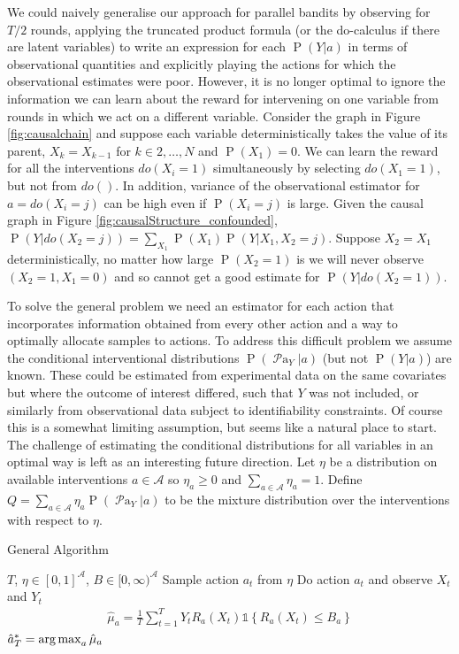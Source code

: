 \documentclass[11pt,a4paper,twoside]{report}
\newcommand{\calA}{\mathcal A}
\newcommand{\set}[1]{\left\{#1\right\}}
\newcommand{\ind}[1]{\mathds{1}\!\!\set{#1}}
\newcommand{\argmax}{\operatornamewithlimits{arg\,max}}
\newcommand{\eq}[1]{\begin{align*}#1\end{align*}}
\renewcommand{\P}[1]{\operatorname{P}\left(#1\right)}
\newcommand{\parents}[1]{\operatorname{\mathcal{P}a}_{#1}}
\theoremstyle{plain}
\theoremstyle{definition}
\begin{document}
We could naively generalise our approach for parallel bandits by observing for $T/2$ rounds, applying the truncated product formula (or the do-calculus if there are latent variables) to write an expression for each $\P{Y|a}$ in terms of observational quantities and explicitly playing the actions for which the observational 
estimates were poor. However, it is no longer optimal to ignore the information we can learn about the reward for intervening on one variable 
from rounds in which we act on a different variable. Consider the graph in Figure \ref{fig:causalchain} and suppose each variable deterministically 
takes the value of its parent, $X_k = X_{k-1}$ for $k\in {2,\ldots,N}$ and $\P{X_1} = 0$. We can learn the reward for all the interventions $do(X_i = 1)$ 
simultaneously by selecting $do(X_1 = 1)$, but not from $do()$. In addition, variance of the observational estimator for $a = do(X_i = j)$ can be 
high even if $\P{X_i = j}$ is large. Given the causal graph in Figure \ref{fig:causalStructure_confounded}, $\P{Y|do(X_2= j)} = \sum_{X_1}\P{X_1}\P{Y|X_1, X_2 = j}$. 
Suppose $X_2 = X_1$ deterministically, no matter how large $\P{X_2 = 1}$ is we will never observe $(X_2=1,X_1 = 0)$ and so cannot 
get a good estimate for $\P{Y|do(X_2=1)}$. 

To solve the general problem we need an estimator for each action that incorporates information obtained from every other action and a way to optimally 
allocate samples to actions. To address this difficult problem we assume the conditional interventional distributions $\P{\parents{Y}|a}$ (but not $\P{Y|a}$) 
are known. These could be estimated from experimental data on the same covariates but where the outcome of interest differed, such that $Y$ was not included, 
or similarly from observational data subject to identifiability constraints. Of course this is a somewhat limiting assumption, but seems like a natural place to
start. The challenge of estimating the conditional distributions for all variables in an optimal way is left as an interesting future direction.
Let $\eta$ be a distribution on available interventions $a \in \calA$ so $\eta_a \geq 0$ and $\sum_{a \in \calA} \eta_a = 1$. 
Define $Q = \sum_{a \in \calA} \eta_a \P{\parents{Y}|a}$ to be the mixture distribution over the interventions with respect to $\eta$.



\begin{algorithm}[H]
\caption{General Algorithm}\label{alg:general}
\begin{algorithmic}
 $T$, $\eta \in [0,1]^{\calA}$, $B \in [0,\infty)^{\calA}$
\FOR{$t \in \set{1,\ldots,T}$}
\STATE Sample action $a_t$ from $\eta$
\STATE Do action $a_t$ and observe $X_t$ and $Y_t$
\ENDFOR
\FOR{$a \in \calA$}
\STATE
\eq {
\hat \mu_a =  \frac{1}{T} \sum_{t=1}^T Y_t R_a(X_t)  \ind{R_a(X_t) \leq B_a}
}
\ENDFOR
{} $\hat a^*_T = \argmax_a \hat \mu_a$
\end{algorithmic}
\end{algorithm}
\end{document}

